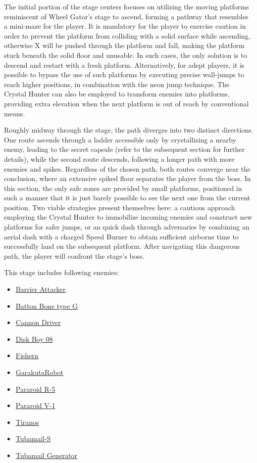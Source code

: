 The initial portion of the stage centers focuses on utilizing the moving platforms reminiscent of Wheel Gator's stage to ascend, forming a pathway that resembles a mini-maze for the player. It is mandatory for the player to exercise caution in order to prevent the platform from colliding with a solid surface while ascending, otherwise X will be pushed through the platform and fall, making the platform stuck beneath the solid floor and  unusable. In such cases, the only solution is to descend and restart with a fresh platform. Alternatively, for adept players, it is possible to bypass the use of such platforms by executing precise wall-jumps to reach higher positions, in combination with the neon jump technique. The Crystal Hunter can also be employed to transform enemies into platforms, providing extra elevation when the next platform is out of reach by conventional means.

Roughly midway through the stage, the path diverges into two distinct directions. One route ascends through a ladder accessible only by crystallizing a nearby enemy, leading to the secret capsule (refer to the subsequent section for further details), while the second route descends, following a longer path with more enemies and spikes. Regardless of the chosen path, both routes converge near the conclusion, where an extensive spiked floor separates the player from the boss. In this section, the only safe zones are provided by small platforms, positioned in such a manner that it is just barely possible to see the next one from the current position. Two viable strategies present themselves here: a cautious approach employing the Crystal Hunter to immobilize incoming enemies and construct new platforms for safer jumps, or an quick dash through adversaries by combining an aerial dash with a charged Speed Burner to obtain sufficient airborne time to successfully land on the subsequent platform. After navigating this dangerous path, the player will confront the stage's boss.

This stage includes following enemies:
\begin{itemize}
	\item \hyperlink{enem:Barrier_Attacker}{Barrier Attacker}
	\item \hyperlink{enem:Batton_Bone_type_G}{Batton Bone type G}
	\item \hyperlink{enem:Cannon_Driver}{Cannon Driver}
	\item \hyperlink{enem:Disk_Boy_08}{Disk Boy 08}
	\item \hyperlink{enem:Fishern}{Fishern}
	\item \hyperlink{enem:Garakuta_Robot}{GarakutaRobot}
	\item \hyperlink{enem:Pararoid_R-5}{Pararoid R-5}
	\item \hyperlink{enem:Pararoid_V-1}{Pararoid V-1}
	\item \hyperlink{enem:Tiranos}{Tiranos}
	\item \hyperlink{enem:Tubamail-S}{Tubamail-S}
	\item \hyperlink{enem:Tubamail_Generator}{Tubamail Generator}
\end{itemize}


